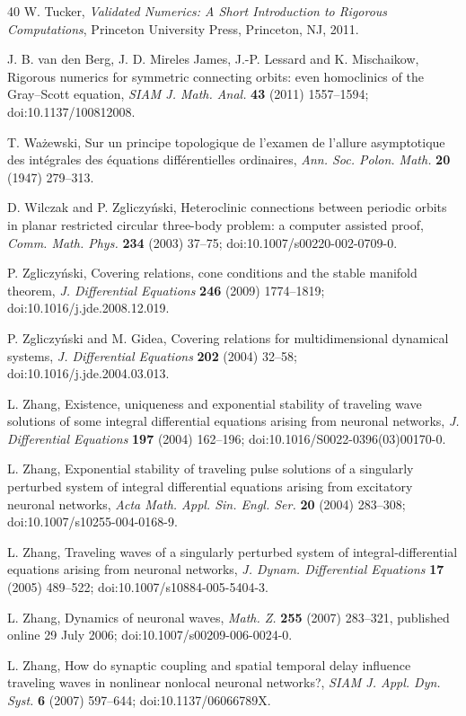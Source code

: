 \documentclass[11pt]{article}
\theoremstyle{definition}
\begin{document}
\begin{thebibliography}{40}
 W. Tucker, \emph{Validated Numerics: A Short Introduction to Rigorous Computations}, Princeton University Press, Princeton, NJ, 2011.

 J. B. van den Berg, J. D. Mireles James, J.-P. Lessard and K. Mischaikow, Rigorous numerics for symmetric connecting orbits: even homoclinics of the Gray--Scott equation, \emph{SIAM J. Math. Anal.} \textbf{43} (2011) 1557--1594; doi:10.1137/100812008.

 T. Wa\.zewski, Sur un principe topologique de l'examen de l'allure asymptotique des int\'egrales des \'equations diff\'erentielles ordinaires, \emph{Ann. Soc. Polon. Math.} \textbf{20} (1947) 279--313.

 D. Wilczak and P. Zgliczy\'nski, Heteroclinic connections between periodic orbits in planar restricted circular three-body problem: a computer assisted proof, \emph{Comm. Math. Phys.} \textbf{234} (2003) 37--75; doi:10.1007/s00220-002-0709-0.

 P. Zgliczy\'nski, Covering relations, cone conditions and the stable manifold theorem, \emph{J. Differential Equations} \textbf{246} (2009) 1774--1819; doi:10.1016/j.jde.2008.12.019.

 P. Zgliczy\'nski and M. Gidea, Covering relations for multidimensional dynamical systems, \emph{J. Differential Equations} \textbf{202} (2004) 32--58; doi:10.1016/j.jde.2004.03.013.

 L. Zhang, Existence, uniqueness and exponential stability of traveling wave solutions of some integral differential equations arising from neuronal networks, \emph{J. Differential Equations} \textbf{197} (2004) 162--196; doi:10.1016/S0022-0396(03)00170-0.

 L. Zhang, Exponential stability of traveling pulse solutions of a singularly perturbed system of integral differential equations arising from excitatory neuronal networks, \emph{Acta Math. Appl. Sin. Engl. Ser.} \textbf{20} (2004) 283--308; doi:10.1007/s10255-004-0168-9.

 L. Zhang, Traveling waves of a singularly perturbed system of integral-differential equations arising from neuronal networks, \emph{J. Dynam. Differential Equations} \textbf{17} (2005) 489--522; doi:10.1007/s10884-005-5404-3.

 L. Zhang, Dynamics of neuronal waves, \emph{Math. Z.} \textbf{255} (2007) 283--321, published online 29 July 2006; doi:10.1007/s00209-006-0024-0.

 L. Zhang, How do synaptic coupling and spatial temporal delay influence traveling waves in nonlinear nonlocal neuronal networks?, \emph{SIAM J. Appl. Dyn. Syst.} \textbf{6} (2007) 597--644; doi:10.1137/06066789X.

\end{thebibliography}
\end{document}
